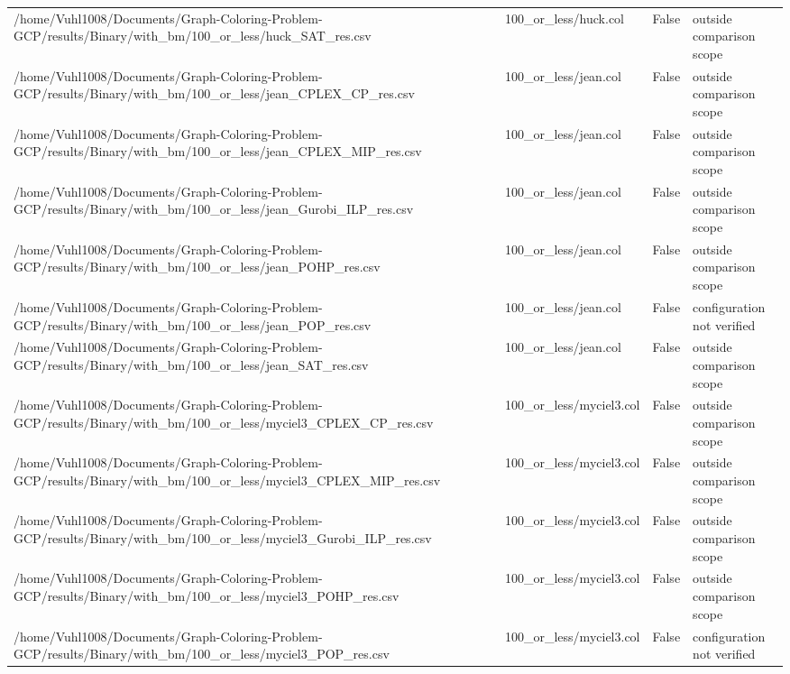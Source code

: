 \begin{table}[htbp]
\begin{tabular}{llll}
/home/Vuhl1008/Documents/Graph-Coloring-Problem-GCP/results/Binary/with\_bm/100\_or\_less/huck\_SAT\_res.csv & 100\_or\_less/huck.col & False & outside comparison scope \\
/home/Vuhl1008/Documents/Graph-Coloring-Problem-GCP/results/Binary/with\_bm/100\_or\_less/jean\_CPLEX\_CP\_res.csv & 100\_or\_less/jean.col & False & outside comparison scope \\
/home/Vuhl1008/Documents/Graph-Coloring-Problem-GCP/results/Binary/with\_bm/100\_or\_less/jean\_CPLEX\_MIP\_res.csv & 100\_or\_less/jean.col & False & outside comparison scope \\
/home/Vuhl1008/Documents/Graph-Coloring-Problem-GCP/results/Binary/with\_bm/100\_or\_less/jean\_Gurobi\_ILP\_res.csv & 100\_or\_less/jean.col & False & outside comparison scope \\
/home/Vuhl1008/Documents/Graph-Coloring-Problem-GCP/results/Binary/with\_bm/100\_or\_less/jean\_POHP\_res.csv & 100\_or\_less/jean.col & False & outside comparison scope \\
/home/Vuhl1008/Documents/Graph-Coloring-Problem-GCP/results/Binary/with\_bm/100\_or\_less/jean\_POP\_res.csv & 100\_or\_less/jean.col & False & configuration not verified \\
/home/Vuhl1008/Documents/Graph-Coloring-Problem-GCP/results/Binary/with\_bm/100\_or\_less/jean\_SAT\_res.csv & 100\_or\_less/jean.col & False & outside comparison scope \\
/home/Vuhl1008/Documents/Graph-Coloring-Problem-GCP/results/Binary/with\_bm/100\_or\_less/myciel3\_CPLEX\_CP\_res.csv & 100\_or\_less/myciel3.col & False & outside comparison scope \\
/home/Vuhl1008/Documents/Graph-Coloring-Problem-GCP/results/Binary/with\_bm/100\_or\_less/myciel3\_CPLEX\_MIP\_res.csv & 100\_or\_less/myciel3.col & False & outside comparison scope \\
/home/Vuhl1008/Documents/Graph-Coloring-Problem-GCP/results/Binary/with\_bm/100\_or\_less/myciel3\_Gurobi\_ILP\_res.csv & 100\_or\_less/myciel3.col & False & outside comparison scope \\
/home/Vuhl1008/Documents/Graph-Coloring-Problem-GCP/results/Binary/with\_bm/100\_or\_less/myciel3\_POHP\_res.csv & 100\_or\_less/myciel3.col & False & outside comparison scope \\
/home/Vuhl1008/Documents/Graph-Coloring-Problem-GCP/results/Binary/with\_bm/100\_or\_less/myciel3\_POP\_res.csv & 100\_or\_less/myciel3.col & False & configuration not verified \\

\end{tabular}
\end{table}
